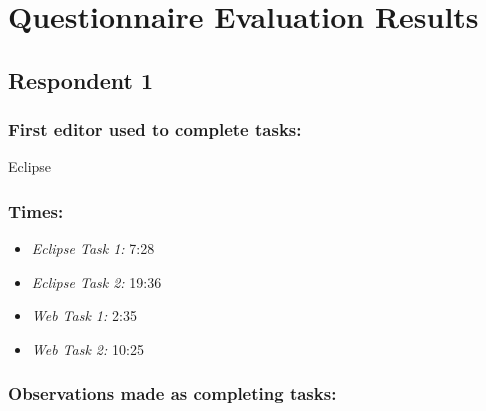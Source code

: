 




\section{Questionnaire Evaluation Results}\label{questionnaireEvalResults}

\subsection{Respondent 1}
\subsubsection*{First editor used to complete tasks:} Eclipse
\subsubsection*{Times:}
\begin{itemize}
\item \emph{Eclipse Task 1:} 7:28
\item \emph{Eclipse Task 2:} 19:36
\item \emph{Web Task 1:} 2:35
\item \emph{Web Task 2:} 10:25
\end{itemize}
\subsubsection*{Observations made as completing tasks:}

